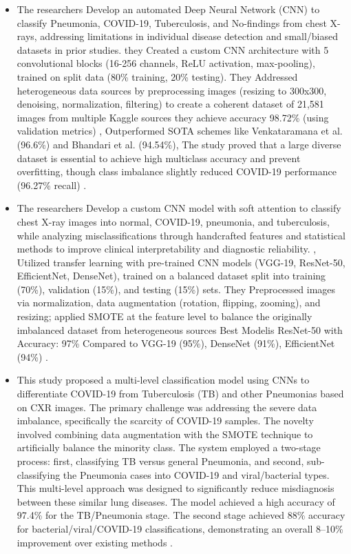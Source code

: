 \begin{itemize} \itemsep 10pt
	\item The researchers Develop an automated Deep Neural Network (CNN) to classify Pneumonia, COVID-19, Tuberculosis, and No-findings from chest X-rays, addressing limitations in individual disease detection and small/biased datasets in prior studies.
	they Created a custom CNN architecture with 5 convolutional blocks (16-256 channels, ReLU activation, max-pooling), trained on split data (80\% training, 20\% testing). They Addressed heterogeneous data sources by preprocessing images (resizing to 300x300, denoising, normalization, filtering) to create a coherent dataset of 21,581 images from multiple Kaggle sources they achieve accuracy 98.72\% (using validation metrics) , Outperformed SOTA schemes like Venkataramana et al. (96.6\%) and Bhandari et al. (94.54\%), The study proved that a large diverse dataset is essential to achieve high multiclass accuracy and prevent overfitting, though class imbalance slightly reduced COVID-19 performance (96.27\% recall) \cite{ref10}.
	\item The researchers Develop a custom CNN model with soft attention to classify chest X-ray images into normal, COVID-19, pneumonia, and tuberculosis, while analyzing misclassifications through handcrafted features and statistical methods to improve clinical interpretability and diagnostic reliability. , Utilized transfer learning with pre-trained CNN models (VGG-19, ResNet-50, EfficientNet, DenseNet), trained on a balanced dataset split into training (70\%), validation (15\%), and testing (15\%) sets. They Preprocessed images via normalization, data augmentation (rotation, flipping, zooming), and resizing; applied SMOTE at the feature level to balance the originally imbalanced dataset from heterogeneous sources Best Modelis  ResNet-50 with 
	Accuracy:  97\% Compared to VGG-19 (95\%), DenseNet (91\%), EfficientNet (94\%) \cite{ref11}. 
	\item This study proposed a multi-level classification model using CNNs to differentiate COVID-19 from Tuberculosis (TB) and other Pneumonias based on CXR images. The primary challenge was addressing the severe data imbalance, specifically the scarcity of COVID-19 samples. The novelty involved combining data augmentation with the SMOTE technique to artificially balance the minority class. The system employed a two-stage process: first, classifying TB versus general Pneumonia, and second, sub-classifying the Pneumonia cases into COVID-19 and viral/bacterial types. This multi-level approach was designed to significantly reduce misdiagnosis between these similar lung diseases. The model achieved a high accuracy of 97.4\% for the TB/Pneumonia stage. The second stage achieved 88\% accuracy for bacterial/viral/COVID-19 classifications, demonstrating an overall 8–10\% improvement over existing methods \cite{ref12}.

\end{itemize}
